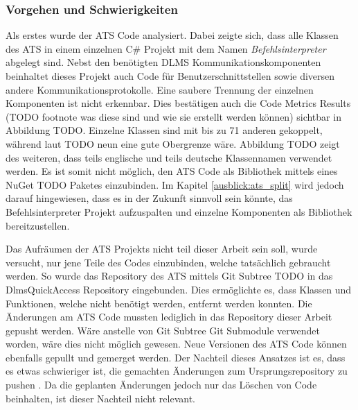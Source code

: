 \subsubsection{Vorgehen und Schwierigkeiten}
Als erstes wurde der ATS Code analysiert.
Dabei zeigte sich, dass alle Klassen des \ac{ATS} in einem einzelnen C\# Projekt mit dem Namen \textit{Befehlsinterpreter} abgelegt sind.
Nebst den benötigten \ac{DLMS} Kommunikationskomponenten beinhaltet dieses Projekt auch Code für Benutzerschnittstellen sowie diversen andere Kommunikationsprotokolle.
Eine saubere Trennung der einzelnen Komponenten ist nicht erkennbar. 
Dies bestätigen auch die Code Metrics Results (TODO footnote was diese sind und wie sie erstellt werden können) sichtbar in Abbildung TODO.
Einzelne Klassen sind mit bis zu 71 anderen gekoppelt, während laut \parencite{quantitativeInvestigationRiskCodeMetrics} TODO neun eine gute Obergrenze wäre.
Abbildung TODO zeigt des weiteren, dass teils englische und teils deutsche Klassennamen verwendet werden.
Es ist somit nicht möglich, den \ac{ATS} Code als Bibliothek mittels eines NuGet TODO Paketes einzubinden.
Im Kapitel \ref{ausblick:ats_split} wird jedoch darauf hingewiesen, dass es in der Zukunft sinnvoll sein könnte,
das Befehlsinterpreter Projekt aufzuspalten und einzelne Komponenten als Bibliothek bereitzustellen.

Das Aufräumen der \ac{ATS} Projekts nicht teil dieser Arbeit sein soll, wurde versucht, nur jene Teile des Codes einzubinden, welche tatsächlich gebraucht werden.
So wurde das Repository des \ac{ATS} mittels Git Subtree TODO in das DlmsQuickAccess Repository eingebunden. 
Dies ermöglichte es, dass Klassen und Funktionen, welche nicht benötigt werden, entfernt werden konnten.
Die Änderungen am \ac{ATS} Code mussten lediglich in das Repository dieser Arbeit gepusht werden.
Wäre anstelle von Git Subtree Git Submodule verwendet worden, wäre dies nicht möglich gewesen.
Neue Versionen des \ac{ATS} Code können ebenfalls gepullt und gemerget werden. 
Der Nachteil dieses Ansatzes ist es, dass es etwas schwieriger ist, die gemachten Änderungen zum Ursprungsrepository zu pushen \parencite{gitSubtree}.
Da die geplanten Änderungen jedoch nur das Löschen von Code beinhalten, ist dieser Nachteil nicht relevant.

